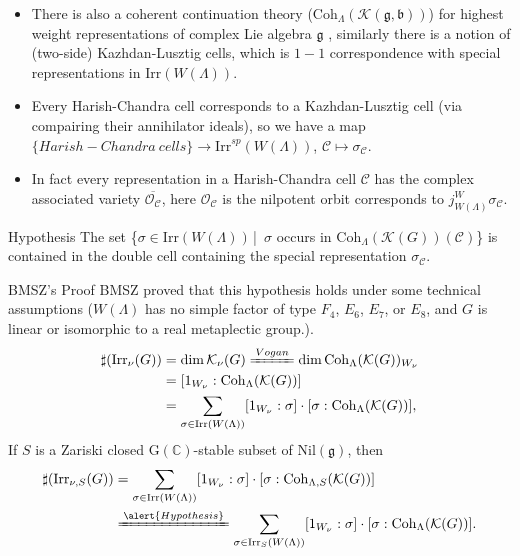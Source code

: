 \documentclass[fleqn,xcolor=dvipsnames]{beamer}
\newcommand{\BC}{{\mathbb {C}}}
\newcommand{\CC}{{\mathcal {C}}}
\newcommand{\CK}{{\mathcal {K}}}
\newcommand{\CO}{{\mathcal {O}}}
\newcommand{\RG}{{\mathrm {G}}}
\newcommand{\fb}{\mathfrak{b}}
\newcommand{\fg}{\mathfrak{g}}
\newcommand{\Irr}{{\mathrm{Irr}}}
\newcommand{\Nil}{{\mathrm{Nil}}}
\newcommand{\set}[2]{\{#1\,|\,#2\}}
\renewcommand{\bar}{\overline}
\begin{document}
\begin{frame}
\begin{itemize}
  \item There is also a coherent continuation theory ($\mathrm{Coh}_{\Lambda}(\CK(\fg,\fb))$) for highest weight representations of complex Lie algebra $\fg$ , similarly there is a notion of (two-side) Kazhdan-Lusztig cells, which is $1-1$ correspondence with special representations in $\Irr(W(\Lambda))$.
  \item Every Harish-Chandra cell corresponds to a Kazhdan-Lusztig cell (via compairing their annihilator ideals), so we have a map $\{Harish-Chandra \ cells\} \to \Irr^{sp}(W(\Lambda))$, $\CC \mapsto \sigma_{\CC}$.
  \item In fact every representation in a Harish-Chandra cell $\CC$ has the complex associated variety $\bar{\CO_{\CC}}$, here $\CO_{\CC}$ is the nilpotent orbit corresponds to $j_{W(\Lambda)}^{W}\sigma_{\CC}$.
\end{itemize}


  \begin{block}{Hypothesis}
    The set \set{$\sigma \in \Irr(W(\Lambda))$}{ \textrm{$\sigma$ occurs in $\mathrm{Coh}_{\Lambda}(\CK(G))(\CC)$}} is contained in the double cell containing the special representation $\sigma_{\CC}$.
  \end{block}

  
\end{frame}




\begin{frame}{BMSZ's Proof}
  BMSZ proved that this hypothesis holds under some technical assumptions ($W(\Lambda)$ has no simple factor of type $F_4$, $E_6$, $E_7$, or $E_8$, and $G$ is linear or isomorphic to a real metaplectic group.).
  \begin{align*}
    \sharp(\Irr_{\nu}(G)) &= \dim \CK_{\nu}(G) \xlongequal{Vogan} \dim \mathrm{Coh}_{\Lambda}(\CK(G))_{W_\nu} \\
    & = [1_{W_{\nu}}:\mathrm{Coh}_{\Lambda}(\CK(G))] \\
    & = \sum_{\sigma \in \Irr(W(\Lambda))} [1_{W_\nu}:\sigma] \cdot [\sigma:\mathrm{Coh}_{\Lambda}(\CK(G))],
  \end{align*}
  If $S$ is a Zariski closed $\RG(\BC)$-stable subset of $\Nil(\fg)$, then
  \begin{align*}
    \sharp(\Irr_{\nu,S}(G)) & = \sum_{\sigma \in \Irr(W(\Lambda))} [1_{W_\nu}:\sigma] \cdot [\sigma:\mathrm{Coh}_{\Lambda,S}(\CK(G))]\\
    & \xlongequal{\alert{Hypothesis}} \sum_{\sigma \in \Irr_{S}(W(\Lambda))} [1_{W_\nu}:\sigma] \cdot [\sigma:\mathrm{Coh}_{\Lambda}(\CK(G))].
  \end{align*}
\end{frame}
\end{document}
